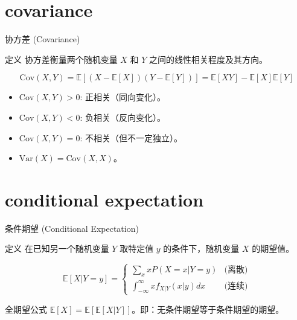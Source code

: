 \documentclass[12pt, t, aspectratio=169]{beamer}
\newcommand{\E}{\mathbb{E}}
\newcommand{\Var}{\text{Var}}
\newcommand{\Cov}{\text{Cov}}
\begin{document}
\section{covariance}
\begin{frame}{协方差 (Covariance)}
    \begin{block}{定义}
        协方差衡量两个随机变量 $X$ 和 $Y$ 之间的线性相关程度及其方向。
    \end{block}
    
    \begin{equation*}
        \Cov(X, Y) = \E[(X - \E[X])(Y - \E[Y])] = \E[XY] - \E[X]\E[Y]
    \end{equation*}
    
    \vspace{0.5cm}
    \begin{itemize}
        \item $\Cov(X, Y) > 0$: 正相关（同向变化）。
        \item $\Cov(X, Y) < 0$: 负相关（反向变化）。
        \item $\Cov(X, Y) = 0$: 不相关（但不一定独立）。
        \item $\Var(X) = \Cov(X, X)$。
    \end{itemize}
\end{frame}

\section{conditional expectation}
\begin{frame}{条件期望 (Conditional Expectation)}
    \begin{block}{定义}
        在已知另一个随机变量 $Y$ 取特定值 $y$ 的条件下，随机变量 $X$ 的期望值。
    \end{block}
    
    \begin{equation*}
        \E[X|Y=y] = \begin{cases} 
        \sum_{x} x P(X=x|Y=y) & \text{(离散)} \\
        \int_{-\infty}^{\infty} x f_{X|Y}(x|y) dx & \text{(连续)}
        \end{cases}
    \end{equation*}
    
    \vspace{0.5cm}
    \begin{alertblock}{全期望公式}
        $\E[X] = \E[\E[X|Y]]$。即：无条件期望等于条件期望的期望。
    \end{alertblock}
\end{frame}
\end{document}
